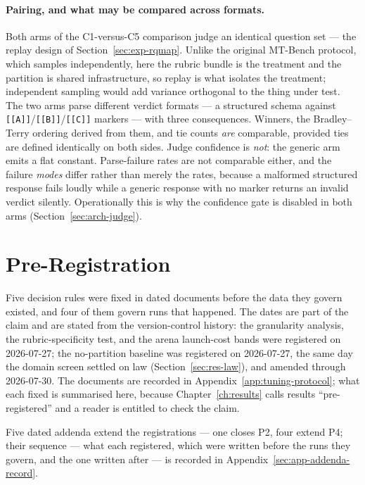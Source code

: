 \paragraph{Pairing, and what may be compared across formats.}
Both arms of the C1-versus-C5 comparison judge an identical question
set --- the replay design of Section~\ref{sec:exp-rqmap}. Unlike the
original MT-Bench protocol, which samples independently, here the
rubric bundle is the treatment and the partition is shared
infrastructure, so replay is what isolates the treatment; independent
sampling would add variance orthogonal to the thing under test.
The two arms parse different verdict formats --- a structured schema
against \texttt{[[A]]}/\texttt{[[B]]}/\texttt{[[C]]} markers --- with
three consequences. Winners, the Bradley--Terry ordering derived from
them, and tie counts \emph{are} comparable, provided ties are defined
identically on both sides. Judge confidence is \emph{not}: the generic
arm emits a flat constant. Parse-failure rates are not comparable
either, and the failure \emph{modes} differ rather than merely the
rates, because a malformed structured response fails loudly while a
generic response with no marker returns an invalid verdict silently.
Operationally this is why the confidence gate is disabled in both
arms (Section~\ref{sec:arch-judge}).

\section{Pre-Registration}\label{sec:exp-prereg}

Five decision rules were fixed in dated documents before the data they
govern existed, and four of them govern runs that happened. The dates
are part of the claim and are stated from the version-control history:
the granularity analysis, the rubric-specificity test, and the arena
launch-cost bands were registered on 2026-07-27; the no-partition
baseline was registered on 2026-07-27, the same day the domain screen
settled on law (Section~\ref{sec:res-law}), and amended through
2026-07-30. The documents are recorded in
Appendix~\ref{app:tuning-protocol}; what each fixed is summarised here,
because Chapter~\ref{ch:results} calls results ``pre-registered'' and a
reader is entitled to check the claim.

Five dated addenda extend the registrations --- one closes P2, four
extend P4; their
sequence --- what each registered, which were written before the runs
they govern, and the one written after --- is recorded in
Appendix~\ref{sec:app-addenda-record}.

